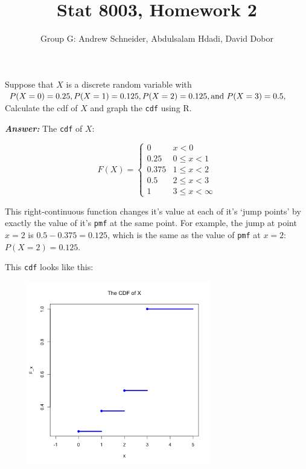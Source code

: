\documentclass[12pt]{article}
\newenvironment{question}[2][Question]{\begin{trivlist}
\item[\hskip \labelsep {\bfseries #1}\hskip \labelsep {\bfseries #2.}]}{\end{trivlist}}
\begin{document}
 

 
\title{Stat 8003, Homework 2}%
\author{Group G: Andrew Schneider,  Abdulsalam Hdadi, David Dobor
\\ %
} %
 
\maketitle
 
 
\begin{question}{2.1} %
Suppose that $X$ is a discrete random variable with $P (X= 0) = 0.25, \\P (X = 1) = 0.125, P (X = 2) = 0.125, \text{and } P(X = 3) = 0.5, $ Calculate the cdf of $X$ and graph the \texttt{cdf} using $\mathrm{R}$.
\end{question}
 
 \textbf{\emph{Answer:} } The \texttt{cdf} of $X$: 
 
 \[ 
 F(X) = 
  \begin{cases} 
       0   & x <  0 \\
      0.25 & 0\leq x < 1 \\
      0.375 & 1\leq x < 2\\
      0.5 & 2\leq x < 3\\
      1 & 3\leq x < \infty 
   \end{cases}
\]
 
 This right-continuous function changes it's value at each of it's `jump points' by exactly the value of it's \texttt{pmf} at the same point. For example, the jump at point $ x = 2 $ is $0.5 - 0.375 = 0.125$, which is the same as the value of \texttt{pmf} at  $ x = 2$: $P (X = 2) = 0.125.$ 
 
 This \texttt{cdf} looks like this:
 
 \begin{center}
 \includegraphics[width=10cm, height=8cm]{hw2q1_cdf}
\end{center}
\end{document}
